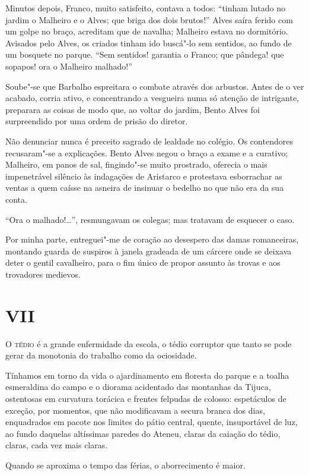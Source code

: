 Minutos depois, Franco, muito satisfeito,
contava a todos: ``tinham lutado no jardim o Malheiro e o Alves; que
briga dos dois brutos!'' Alves saíra ferido com um golpe no braço,
acreditam que de navalha; Malheiro estava no dormitório. Avisados pelo
Alves, os criados tinham ido buscá"-lo sem sentidos, ao fundo de um
bosquete no parque. ``Sem sentidos! garantia o Franco; que pândega! que
sopapos! ora o Malheiro malhado!'' 

Soube"-se que Barbalho espreitara o
combate através dos arbustos. Antes de o ver acabado, corria ativo, e
concentrando a vesgueira numa só atenção de intrigante, preparara as
coisas de modo que, ao voltar do jardim, Bento Alves foi surpreendido
por uma ordem de prisão do diretor. 

Não denunciar nunca é preceito
sagrado de lealdade no colégio. Os contendores recusaram"-se a
explicações. Bento Alves negou o braço a exame e a curativo; Malheiro,
em panos de sal, fingindo"-se muito prostrado, oferecia o mais
impenetrável silêncio às indagações de Aristarco e protestava
esborrachar as ventas a quem caísse na asneira de insinuar o bedelho no
que não era da sua conta. 

``Ora o malhado!\ldots{}'', resmungavam os colegas;
mas tratavam de esquecer o caso. 

Por minha parte, entreguei"-me de
coração ao desespero das damas romanceiras, montando guarda de suspiros
à janela gradeada de um cárcere onde se deixava deter o gentil
cavalheiro, para o fim único de propor assunto às trovas e aos
trovadores medievos.

\section{VII}
\noindent\textsc{O tédio} é a grande enfermidade da escola, o tédio corruptor que tanto se
pode gerar da monotonia do trabalho como da ociosidade. 

Tínhamos em
torno da vida o ajardinamento em floresta do parque e a toalha
esmeraldina do campo e o diorama acidentado das montanhas da Tijuca,
ostentosas em curvatura torácica e frentes felpudas de colosso:
espetáculos de exceção, por momentos, que não modificavam a secura
branca dos dias, enquadrados em pacote nos limites do pátio central,
quente, insuportável de luz, ao fundo daquelas altíssimas paredes do
Ateneu, claras da caiação do tédio, claras, cada vez mais claras.

Quando se aproxima o tempo das férias, o aborrecimento é maior.



